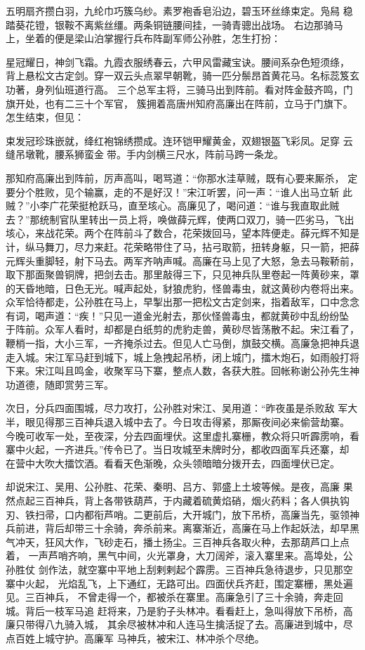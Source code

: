 五明扇齐攒白羽，九纶巾巧簇乌纱。素罗袍香皂沿边，碧玉环丝绦束定。凫舄
稳踏葵花镫，银鞍不离紫丝缰。两条铜链腰间挂，一骑青骢出战场。
右边那骑马上，坐着的便是梁山泊掌握行兵布阵副军师公孙胜，怎生打扮：

星冠耀日，神剑飞霜。九霞衣服绣春云，六甲风雷藏宝诀。腰间系杂色短须绦，
背上悬松文古定剑。穿一双云头点翠早朝靴，骑一匹分鬃昂首黄花马。名标蕊笈玄
功著，身列仙班道行高。
三个总军主将，三骑马出到阵前。看对阵金鼓齐鸣，门旗开处，也有二三十个军官，
簇拥着高唐州知府高廉出在阵前，立马于门旗下。怎生结束，但见：

束发冠珍珠嵌就，绛红袍锦绣攒成。连环铠甲耀黄金，双翅银盔飞彩凤。足穿
云缝吊墩靴，腰系狮蛮金带。手内剑横三尺水，阵前马跨一条龙。

那知府高廉出到阵前，厉声高叫，喝骂道：“你那水洼草贼，既有心要来厮杀，
定要分个胜败，见个输赢，走的不是好汉！”宋江听罢，问一声：“谁人出马立斩
此贼？”小李广花荣挺枪跃马，直至垓心。高廉见了，喝问道：“谁与我直取此贼
去？”那统制官队里转出一员上将，唤做薛元辉，使两口双刀，骑一匹劣马，飞出
垓心，来战花荣。两个在阵前斗了数合，花荣拨回马，望本阵便走。薛元辉不知是
计，纵马舞刀，尽力来赶。花荣略带住了马，拈弓取箭，扭转身躯，只一箭，把薛
元辉头重脚轻，射下马去。两军齐呐声喊。高廉在马上见了大怒，急去马鞍鞒前，
取下那面聚兽铜牌，把剑去击。那里敲得三下，只见神兵队里卷起一阵黄砂来，罩
的天昏地暗，日色无光。喊声起处，豺狼虎豹，怪兽毒虫，就这黄砂内卷将出来。
众军恰待都走，公孙胜在马上，早掣出那一把松文古定剑来，指着敌军，口中念念
有词，喝声道：“疾！”只见一道金光射去，那伙怪兽毒虫，都就黄砂中乱纷纷坠
于阵前。众军人看时，却都是白纸剪的虎豹走兽，黄砂尽皆荡散不起。宋江看了，
鞭梢一指，大小三军，一齐掩杀过去。但见人亡马倒，旗鼓交横。高廉急把神兵退
走入城。宋江军马赶到城下，城上急拽起吊桥，闭上城门，擂木炮石，如雨般打将
下来。宋江叫且鸣金，收聚军马下寨，整点人数，各获大胜。回帐称谢公孙先生神
功道德，随即赏劳三军。

次日，分兵四面围城，尽力攻打，公孙胜对宋江、吴用道：“昨夜虽是杀败敌
军大半，眼见得那三百神兵退入城中去了。今日攻击得紧，那厮夜间必来偷营劫寨。
今晚可收军一处，至夜深，分去四面埋伏。这里虚扎寨栅，教众将只听霹雳响，看
寨中火起，一齐进兵。”传令已了。当日攻城至未牌时分，都收四面军兵还寨，却
在营中大吹大擂饮酒。看看天色渐晚，众头领暗暗分拨开去，四面埋伏已定。

却说宋江、吴用、公孙胜、花荣、秦明、吕方、郭盛上土坡等候。是夜，高廉
果然点起三百神兵，背上各带铁葫芦，于内藏着硫黄焰硝，烟火药料；各人俱执钩
刃、铁扫帚，口内都衔芦哨。二更前后，大开城门，放下吊桥，高廉当先，驱领神
兵前进，背后却带三十余骑，奔杀前来。离寨渐近，高廉在马上作起妖法，却早黑
气冲天，狂风大作，飞砂走石，播土扬尘。三百神兵各取火种，去那葫芦口上点着，
一声芦哨齐响，黑气中间，火光罩身，大刀阔斧，滚入寨里来。高埠处，公孙胜仗
剑作法，就空寨中平地上刮剌剌起个霹雳。三百神兵急待退步，只见那空寨中火起，
光焰乱飞，上下通红，无路可出。四面伏兵齐赶，围定寨栅，黑处遍见。三百神兵，
不曾走得一个，都被杀在寨里。高廉急引了三十余骑，奔走回城。背后一枝军马追
赶将来，乃是豹子头林冲。看看赶上，急叫得放下吊桥，高廉只带得八九骑入城，
其余尽被林冲和人连马生擒活捉了去。高廉进到城中，尽点百姓上城守护。高廉军
马神兵，被宋江、林冲杀个尽绝。

